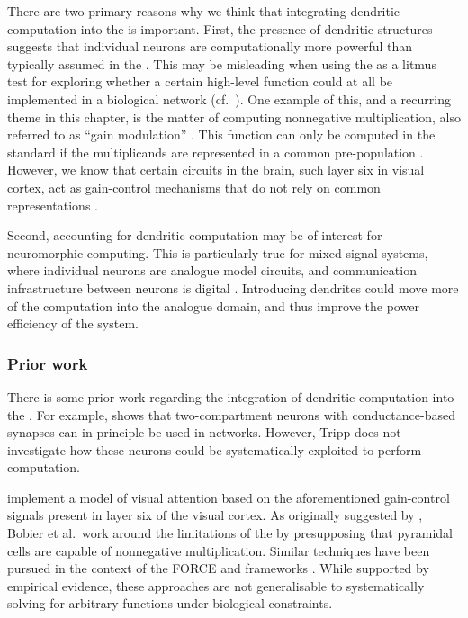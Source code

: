 There are two primary reasons why we think that integrating dendritic computation into the \NEF is important.
First, the presence of dendritic structures suggests that individual neurons are computationally more powerful than typically assumed in the \NEF.
This may be misleading when using the \NEF as a litmus test for exploring whether a certain high-level function could at all be implemented in a biological network (cf.~).
One example of this, and a recurring theme in this chapter, is the matter of computing nonnegative multiplication, also referred to as \enquote{gain modulation} \citep{salinas2000gain}.
This function can only be computed in the standard \NEF if the multiplicands are represented in a common pre-population \citep[Section~6.3]{eliasmith2003neural}.
However, we know that certain circuits in the brain, such layer six in visual cortex, act as gain-control mechanisms that do not rely on common representations \citep{olsen2012gain,bobier2014unifying}.

Second, accounting for dendritic computation may be of interest for neuromorphic computing.
This is particularly true for mixed-signal systems, where individual neurons are analogue model circuits, and communication infrastructure between neurons is digital \citep[e.g.,][]{neckar2019braindrop,schemmel2010waferscale}.
Introducing dendrites could move more of the computation into the analogue domain, and thus improve the power efficiency of the system.

\subsubsection{Prior work}
There is some prior work regarding the integration of dendritic computation into the \NEF.
For example,  shows that two-compartment neurons with conductance-based synapses can in principle be used in \NEF networks.
However, Tripp does not investigate how these neurons could be systematically exploited to perform computation.

 implement a model of visual attention based on the aforementioned gain-control signals present in layer six of the visual cortex.
As originally suggested by , Bobier et al.~work around the limitations of the \NEF by presupposing that pyramidal cells are capable of nonnegative multiplication.
Similar techniques have been pursued in the context of the FORCE and \EBN frameworks \citep{thalmeier2016learning,alemi2018learning}.
While supported by empirical evidence, these approaches are not generalisable to systematically solving for arbitrary functions under biological constraints.

